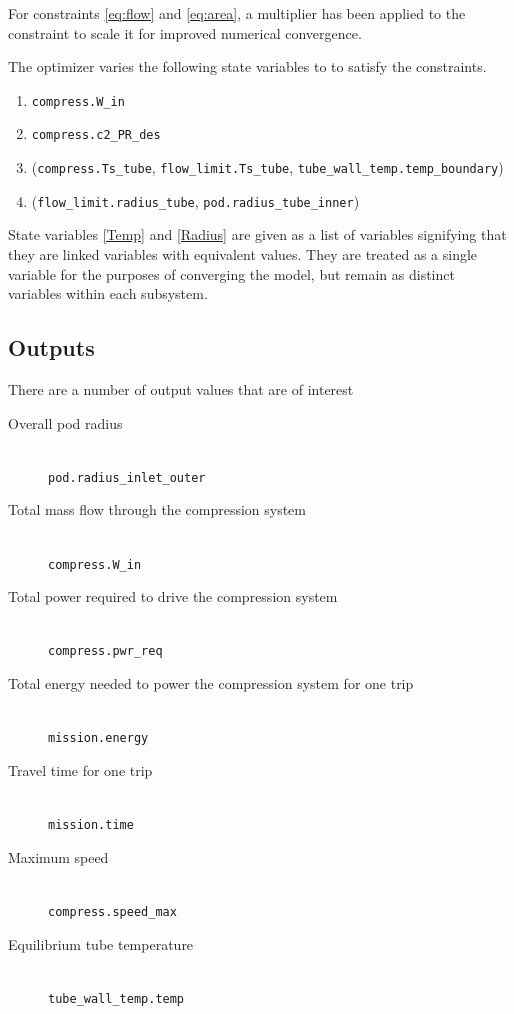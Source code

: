 \documentclass[heading.tex]{subfiles}
\begin{document}
For constraints \ref{eq:flow} and \ref{eq:area}, a multiplier has been applied to the constraint to scale it for improved numerical
convergence.

The optimizer varies  the following state variables to to satisfy the constraints. 

\begin{enumerate}
\item \texttt{compress.W\_in}
\item \texttt{compress.c2\_PR\_des}
\item (\texttt{compress.Ts\_tube}, \texttt{flow\_limit.Ts\_tube}, \texttt{tube\_wall\_temp.temp\_boundary}) \label{Temp}
\item (\texttt{flow\_limit.radius\_tube}, \texttt{pod.radius\_tube\_inner}) \label{Radius}
\end{enumerate}

State variables \ref{Temp} and \ref{Radius} are given as a list of variables signifying that they are linked variables with equivalent values. They are
treated as a single variable for the purposes of converging the model, but remain as distinct variables within each subsystem.

\subsection{Outputs}
There are a number of output values that are of interest

\begin{description}
  \item[Overall pod radius] \hfill \\
  \texttt{pod.radius\_inlet\_outer}
  \item[Total mass flow through the compression system] \hfill \\
  \texttt{compress.W\_in}
  \item[Total power required to drive the compression system] \hfill \\
  \texttt{compress.pwr\_req}
  \item[Total energy needed to power the compression system for one trip] \hfill \\
  \texttt{mission.energy}
  \item[Travel time for one trip] \hfill \\
  \texttt{mission.time}
  \item[Maximum speed] \hfill \\
  \texttt{compress.speed\_max}
  \item[Equilibrium tube temperature] \hfill \\
  \texttt{tube\_wall\_temp.temp}
\end{description}
\end{document}
